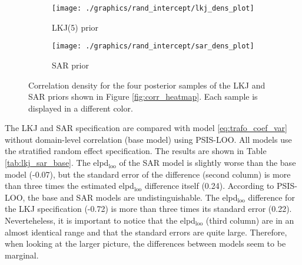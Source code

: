 \begin{figure}
    \begin{subfigure}{0.49\linewidth}
        \texttt{[image: ./graphics/rand\_intercept/lkj\_dens\_plot]}
        \caption{LKJ(5) prior}
    \end{subfigure}
    \begin{subfigure}{0.49\linewidth}
        \texttt{[image: ./graphics/rand\_intercept/sar\_dens\_plot]}
        \caption{SAR prior}
    \end{subfigure}
    \caption[Correlation density for the LKJ and SAR priors]{Correlation density for the four posterior samples of the LKJ and SAR priors shown in Figure \ref{fig:corr_heatmap}. Each sample is displayed in a different color.}
    \label{fig:corr_density}
\end{figure}


The LKJ and SAR specification are compared with model \ref{eq:trafo_coef_var} without domain-level correlation (base model) using PSIS-LOO.
All models use the stratified random effect specification.
The results are shown in Table \ref{tab:lkj_sar_base}.
The elpd$_{\text{loo}}$ of the SAR model is slightly worse than the base model (-0.07), but the standard error of the difference (second column) is more than three times the estimated elpd$_{\text{loo}}$ difference itself (0.24).
According to PSIS-LOO, the base and SAR models are undistinguishable.
The elpd$_{\text{loo}}$ difference for the LKJ specification (-0.72) is more than three times its standard error (0.22).
Neverteheless, it is important to notice that the elpd$_{\text{loo}}$ (third column) are in an almost identical range and that the standard errors are quite large.
Therefore, when looking at the larger picture, the differences between models seem to be marginal.



